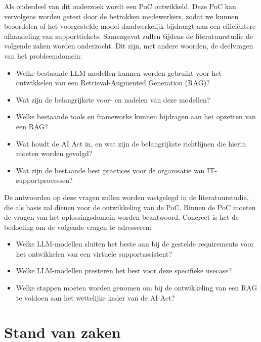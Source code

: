 Als onderdeel van dit onderzoek wordt een PoC ontwikkeld. Deze PoC kan vervolgens worden getest door de betrokken medewerkers, zodat we kunnen beoordelen of het voorgestelde model daadwerkelijk bijdraagt aan een efficiëntere afhandeling van supporttickets. Samengevat zullen tijdens de literatuurstudie de volgende zaken worden onderzocht. Dit zijn, met andere woorden, de deelvragen van het probleemdomein:

\begin{itemize} 
    \item Welke bestaande LLM-modellen kunnen worden gebruikt voor het ontwikkelen van een Retrieval-Augmented Generation (RAG)? 
    \item Wat zijn de belangrijkste voor- en nadelen van deze modellen? 
    \item Welke bestaande tools en frameworks kunnen bijdragen aan het opzetten van een RAG? 
    \item Wat houdt de AI Act in, en wat zijn de belangrijkste richtlijnen die hierin moeten worden gevolgd? 
    \item Wat zijn de bestaande best practices voor de organisatie van IT-supportprocessen? 
\end{itemize}

De antwoorden op deze vragen zullen worden vastgelegd in de literatuurstudie, die als basis zal dienen voor de ontwikkeling van de PoC. Binnen de PoC moeten de vragen van het oplossingsdomein worden beantwoord. Concreet is het de bedoeling om de volgende vragen te adresseren:

\begin{itemize} 
    \item Welke LLM-modellen sluiten het beste aan bij de gestelde requirements voor het ontwikkelen van een virtuele supportassistent? 
    \item Welke LLM-modellen presteren het best voor deze specifieke usecase? 
    \item Welke stappen moeten worden genomen om bij de ontwikkeling van een RAG te voldoen aan het wettelijke kader van de AI Act? 
\end{itemize}


\section{Stand van zaken}%
\label{sec:stand van zaken}

